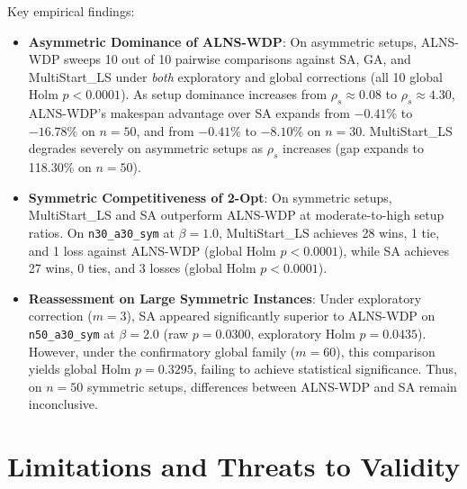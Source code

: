 \documentclass[journal]{IEEEtran}
\begin{document}
Key empirical findings:
\begin{itemize}
    \item \textbf{Asymmetric Dominance of ALNS-WDP}: On asymmetric setups, ALNS-WDP sweeps 10 out of 10 pairwise comparisons against SA, GA, and MultiStart\_LS under \textit{both} exploratory and global corrections (all 10 global Holm $p < 0.0001$). As setup dominance increases from $\rho_s \approx 0.08$ to $\rho_s \approx 4.30$, ALNS-WDP's makespan advantage over SA expands from $-0.41\%$ to $-16.78\%$ on $n=50$, and from $-0.41\%$ to $-8.10\%$ on $n=30$. MultiStart\_LS degrades severely on asymmetric setups as $\rho_s$ increases (gap expands to 118.30\% on $n=50$).
    \item \textbf{Symmetric Competitiveness of 2-Opt}: On symmetric setups, MultiStart\_LS and SA outperform ALNS-WDP at moderate-to-high setup ratios. On \texttt{n30\_a30\_sym} at $\beta=1.0$, MultiStart\_LS achieves 28 wins, 1 tie, and 1 loss against ALNS-WDP (global Holm $p < 0.0001$), while SA achieves 27 wins, 0 ties, and 3 losses (global Holm $p < 0.0001$).
    \item \textbf{Reassessment on Large Symmetric Instances}: Under exploratory correction ($m=3$), SA appeared significantly superior to ALNS-WDP on \texttt{n50\_a30\_sym} at $\beta=2.0$ (raw $p = 0.0300$, exploratory Holm $p = 0.0435$). However, under the confirmatory global family ($m=60$), this comparison yields global Holm $p = 0.3295$, failing to achieve statistical significance. Thus, on $n=50$ symmetric setups, differences between ALNS-WDP and SA remain inconclusive.
\end{itemize}

\section{Limitations and Threats to Validity}
\label{sec:limitations}
\end{document}
